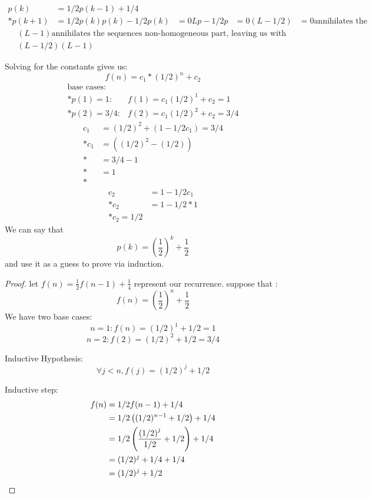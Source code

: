 \documentclass[titlepage]{article}
\theoremstyle{definition}
\begin{document}
    \begin{align}
      p(k) & = 1/2 p(k -1) + 1/4 \\*
      p(k+1) & = 1/2 p(k)
      p(k) - 1/2 p(k) & =  0 
      Lp - 1/2 p & = 0
      \left( L - 1/2 \right) & = 0 \text{annihilates the sequences homogeneous
      part}
    \end{align}
    \begin{align}
      \left(L - 1\right) \text{annihilates the sequences non-homogeneous
      part, leaving us with }\\
      \left( L - 1/2 \right) \left(L - 1\right)
    \end{align}

    Solving for the constants gives us:
    \[ f(n) = c_1 * (1/2)^n + c_2 \]
    \begin{align}
      \text{base cases}: \\*
      p(1) = 1: & f(1) = c_1 (1/2)^1 + c_2 = 1  \\*
      p(2) = 3/4: & f(2) = c_1 (1/2)^2 + c_2 = 3/4
    \end{align}
    \begin{align}
      c_1 &= (1/2)^2 + (1 - 1/2 c_1) = 3/4 \\*
      c_1 &= \left( (1/2)^2 - (1/2)\right) \\*
          &= 3/4 - 1 \\*
          &= 1 \\*
    \end{align}
    \begin{align}
      c_2 &= 1 - 1/2 c_1 \\*
      c_2 &= 1 - 1/2 * 1 \\*
      c_2 = 1/2
    \end{align}
  We can say that 
  \[ p(k) = \left(\frac{1}{2}\right)^k + \frac{1}{2} \]
  and use it as a guess to prove via induction.
  \begin{proof}
      let $f(n) = \frac{1}{2} f(n-1) + \frac{1}{4}$ represent our recurrence. 
      suppose that :
    \[ f(n) = \left(\frac{1}{2}\right)^n + \frac{1}{2} \]
    We have two base cases:
    \[ n =1: f(n) = (1/2)^1 + 1/2 = 1 \]
    \[ n = 2: f(2) = (1/2)^2 + 1/2 = 3/4 \]

    Inductive Hypothesis:
    \[ \forall j < n, f(j) = (1/2)^j + 1/2 \]

    Inductive step:
    \begin{align}
      f(n) &= 1/2 f(n-1) + 1/4 \\*
      &= 1/2\left( (1/2)^{n-1} + 1/2 \right) + 1/4 \\*
      &= 1/2 \left( \frac{\left(1/2\right)^j}{1/2} + 1/2 \right) + 1/4 \\*
      &= (1/2)^j + 1/4 + 1/4 \\*
      &= (1/2)^j + 1/2 \qedhere
    \end{align}
  \end{proof}
\end{document}
